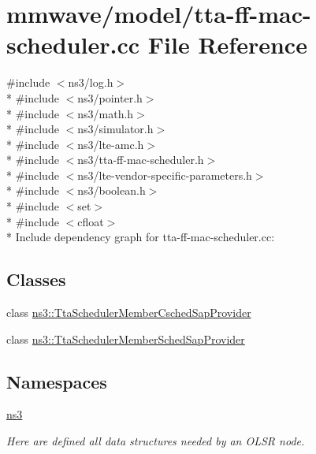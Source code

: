 \hypertarget{mmwave_2model_2tta-ff-mac-scheduler_8cc}{}\section{mmwave/model/tta-\/ff-\/mac-\/scheduler.cc File Reference}
\label{mmwave_2model_2tta-ff-mac-scheduler_8cc}
{\ttfamily \#include $<$ns3/log.\+h$>$}\\*
{\ttfamily \#include $<$ns3/pointer.\+h$>$}\\*
{\ttfamily \#include $<$ns3/math.\+h$>$}\\*
{\ttfamily \#include $<$ns3/simulator.\+h$>$}\\*
{\ttfamily \#include $<$ns3/lte-\/amc.\+h$>$}\\*
{\ttfamily \#include $<$ns3/tta-\/ff-\/mac-\/scheduler.\+h$>$}\\*
{\ttfamily \#include $<$ns3/lte-\/vendor-\/specific-\/parameters.\+h$>$}\\*
{\ttfamily \#include $<$ns3/boolean.\+h$>$}\\*
{\ttfamily \#include $<$set$>$}\\*
{\ttfamily \#include $<$cfloat$>$}\\*
Include dependency graph for tta-\/ff-\/mac-\/scheduler.cc\+:
\subsection*{Classes}
\begin{DoxyCompactItemize}
\item 
class \hyperlink{classns3_1_1TtaSchedulerMemberCschedSapProvider}{ns3\+::\+Tta\+Scheduler\+Member\+Csched\+Sap\+Provider}
\item 
class \hyperlink{classns3_1_1TtaSchedulerMemberSchedSapProvider}{ns3\+::\+Tta\+Scheduler\+Member\+Sched\+Sap\+Provider}
\end{DoxyCompactItemize}
\subsection*{Namespaces}
\begin{DoxyCompactItemize}
\item 
 \hyperlink{namespacens3}{ns3}
\begin{DoxyCompactList}\small\item\em Here are defined all data structures needed by an O\+L\+SR node. \end{DoxyCompactList}\end{DoxyCompactItemize}
